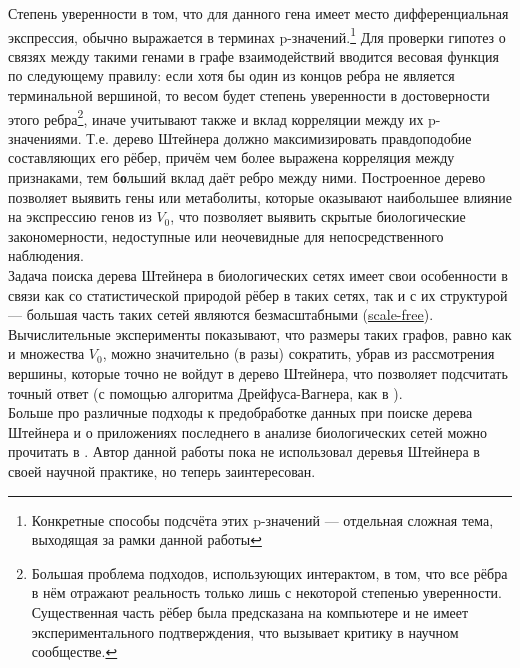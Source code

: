 \documentclass[11pt,a4paper]{report}
\theoremstyle{definition}
\theoremstyle{definition}
\theoremstyle{definition}
\begin{document}
	\noindent Степень уверенности в том, что для данного гена имеет место дифференциальная экспрессия, обычно выражается в терминах p-значений.\footnote{Конкретные способы подсчёта этих p-значений — отдельная сложная тема, выходящая за рамки данной работы} Для проверки гипотез о связях между такими генами в графе взаимодействий вводится весовая функция по следующему правилу: если хотя бы один из концов ребра не является терминальной вершиной, то весом будет степень уверенности в достоверности этого ребра\footnote{Большая проблема подходов, использующих интерактом, в том, что все рёбра в нём отражают реальность только лишь с некоторой степенью уверенности. Существенная часть рёбер была предсказана на компьютере и не имеет экспериментального подтверждения, что вызывает критику в научном сообществе.}, иначе учитывают также и вклад корреляции между их p-значениями. Т.е. дерево Штейнера должно максимизировать правдоподобие составляющих его рёбер, причём чем более выражена корреляция между признаками, тем б\textbf{о}льший вклад даёт ребро между ними. Построенное дерево позволяет выявить гены или метаболиты, которые оказывают наибольшее влияние на экспрессию генов из $V_0$, что позволяет выявить скрытые биологические закономерности, недоступные или неочевидные для непосредственного наблюдения.\\
	
	\noindent Задача поиска дерева Штейнера в биологических сетях имеет свои особенности в связи как со статистической природой рёбер в таких сетях, так и с их структурой — большая часть таких сетей являются безмасштабными  (\href{https://en.wikipedia.org/wiki/Scale-free_network}{scale-free}). Вычислительные эксперименты \cite{UniTubingen} показывают, что размеры таких графов, равно как и множества $V_0$, можно значительно (в разы) сократить, убрав из рассмотрения вершины, которые точно не войдут в дерево Штейнера, что позволяет подсчитать точный ответ (с помощью алгоритма Дрейфуса-Вагнера, как в \cite{UniTubingen}).\\
	
	\noindent Больше про различные подходы к предобработке данных при поиске дерева Штейнера и о приложениях последнего в анализе биологических сетей можно прочитать в \cite{UniTubingen}. Автор данной работы пока не использовал деревья Штейнера в своей научной практике, но теперь заинтересован.
\end{document}
